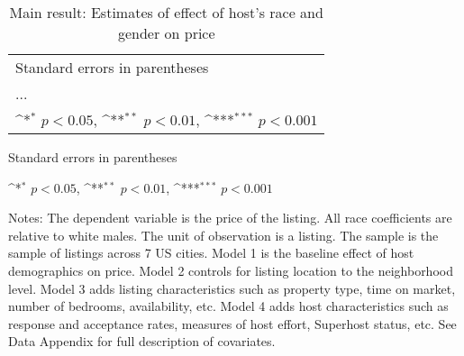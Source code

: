 \documentclass[11pt, oneside]{article}
\begin{document}
\begin{table}[htbp]\centering
	\def\sym#1{\ifmmode^{#1}\else\(^{#1}\)\fi}
	\caption{}
\end{table}

\begin{table}[htbp]\centering
	\def\sym#1{\ifmmode^{#1}\else\(^{#1}\)\fi}
	\caption{}
\end{table}

\begin{table}[htbp]\centering
	\def\sym#1{\ifmmode^{#1}\else\(^{#1}\)\fi}
	\caption{}
\end{table}

\begin{table}[htbp]\centering
	\def\sym#1{\ifmmode^{#1}\else\(^{#1}\)\fi}
	\caption{}
\end{table}

\begin{table}[htbp]\centering
	\def\sym#1{\ifmmode^{#1}\else\(^{#1}\)\fi}
	\caption{Main result: Estimates of effect of host’s race and gender on price}
	\begin{tabular}{l*{5}{c}}
		\hline\hline

	\hline\hline
	\multicolumn{6}{l}{\footnotesize Standard errors in parentheses}\\
	\multicolumn{6}{l}{\footnotesize ...}\\
	\multicolumn{6}{l}{\footnotesize \sym{*} \(p<0.05\), \sym{**} \(p<0.01\), \sym{***} \(p<0.001\)}\\
	\end{tabular}

	\begin{tablenotes}
	\item \footnotesize Standard errors in parentheses
	\item \footnotesize \sym{*} \(p<0.05\), \sym{**} \(p<0.01\), \sym{***} \(p<0.001\)
	
	\item Notes: The dependent variable is the price of the listing. All race coefficients are relative to white males. The unit of observation is a listing. The sample is the sample of listings across 7 US cities. Model 1 is the baseline effect of host demographics on price. Model 2 controls for listing location to the neighborhood level. Model 3 adds listing characteristics such as property type, time on market, number of bedrooms, availability, etc. Model 4 adds host characteristics such as response and acceptance rates, measures of host effort, Superhost status, etc. See Data Appendix for full description of covariates.  
\end{tablenotes}
\end{table}
\end{document}
